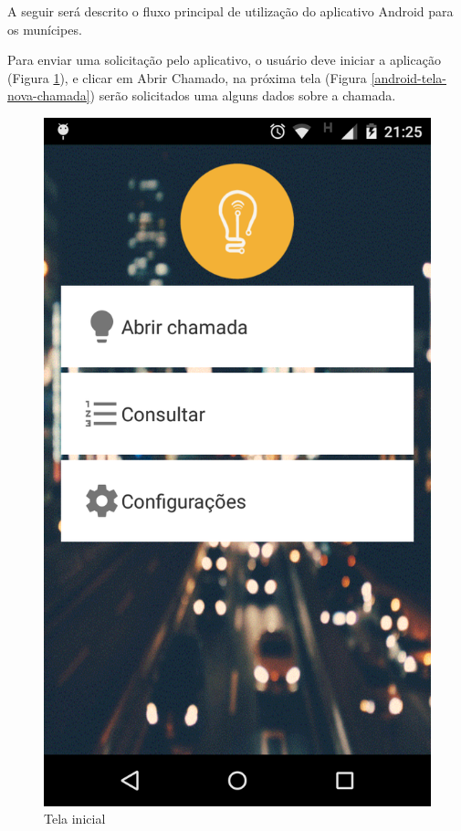 \documentclass[
	article,			%
	11pt,				%
	oneside,			%
	a4paper,			%
	english,			%
	brazil,				%
	sumario=tradicional
	]{abntex2}
\begin{document}
A seguir será descrito o fluxo principal de utilização do aplicativo Android para os munícipes.

Para enviar uma solicitação pelo aplicativo, o usuário deve iniciar a aplicação (Figura \ref{android-tela-inicial}), e clicar em Abrir Chamado, na próxima tela (Figura \ref{android-tela-nova-chamada}) serão solicitados uma alguns dados sobre a chamada.

\begin{figure}[!htbp]
 \centering
  \begin{minipage}{0.4\textwidth}
    \centering
    \caption{\label{android-tela-inicial}Tela inicial}
    \includegraphics[scale=0.1]{android/1.png}

\end{minipage}
\end{figure}
\end{document}
